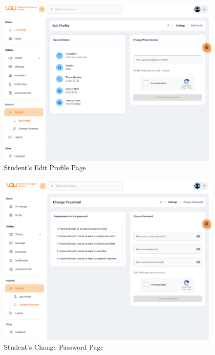 	\begin{figure}[H]
		\centering
		\includegraphics[width=1.0\linewidth]{graphics/gui/student/sett-edit-profile}
		\caption{Student's Edit Profile Page}
		\label{fig:gui-std-sett-edit-profile}
	\end{figure}
	
	
	\begin{figure}[H]
		\centering
		\includegraphics[width=1.0\linewidth]{graphics/gui/student/sett-password}
		\caption{Student's Change Password Page}
		\label{fig:gui-std-sett-password}
	\end{figure}
	
	
